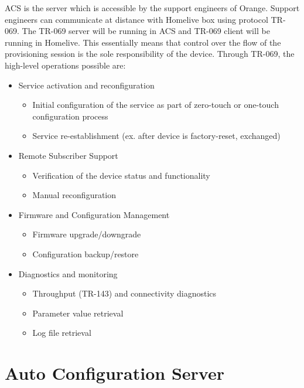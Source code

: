 ACS is the server which is accessible by the support engineers of Orange. Support engineers can communicate at distance with Homelive box using protocol TR-069. The TR-069 server will be running in ACS and TR-069 client will be running in Homelive. This essentially means that control over the flow of the provisioning session is the sole responsibility of the device. Through TR-069, the high-level operations possible are:
\begin{itemize}
  \item Service activation and reconfiguration
  \begin{itemize}
    \item Initial configuration of the service as part of zero-touch or one-touch configuration process
    \item Service re-establishment (ex. after device is factory-reset, exchanged)
  \end{itemize}
  \item Remote Subscriber Support
  \begin{itemize}
    \item Verification of the device status and functionality
    \item Manual reconfiguration
  \end{itemize}
  \item Firmware and Configuration Management
  \begin{itemize}
    \item Firmware upgrade/downgrade
    \item Configuration backup/restore
  \end{itemize}
  \item Diagnostics and monitoring
  \begin{itemize}
    \item Throughput (TR-143) and connectivity diagnostics
    \item Parameter value retrieval
    \item Log file retrieval
  \end{itemize}
\end{itemize}
\section{Auto Configuration Server}
